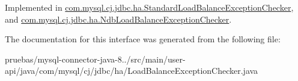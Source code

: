 Implemented in \mbox{\hyperlink{classcom_1_1mysql_1_1cj_1_1jdbc_1_1ha_1_1_standard_load_balance_exception_checker_a24152ea8a4fd653b8597301b47c9624f}{com.\+mysql.\+cj.\+jdbc.\+ha.\+Standard\+Load\+Balance\+Exception\+Checker}}, and \mbox{\hyperlink{classcom_1_1mysql_1_1cj_1_1jdbc_1_1ha_1_1_ndb_load_balance_exception_checker_ace9aa78b697232aab5423f06dd998f82}{com.\+mysql.\+cj.\+jdbc.\+ha.\+Ndb\+Load\+Balance\+Exception\+Checker}}.



The documentation for this interface was generated from the following file\+:\begin{DoxyCompactItemize}
\item 
pruebas/mysql-\/connector-\/java-\/8../src/main/user-\/api/java/com/mysql/cj/jdbc/ha/Load\+Balance\+Exception\+Checker.\+java\end{DoxyCompactItemize}
